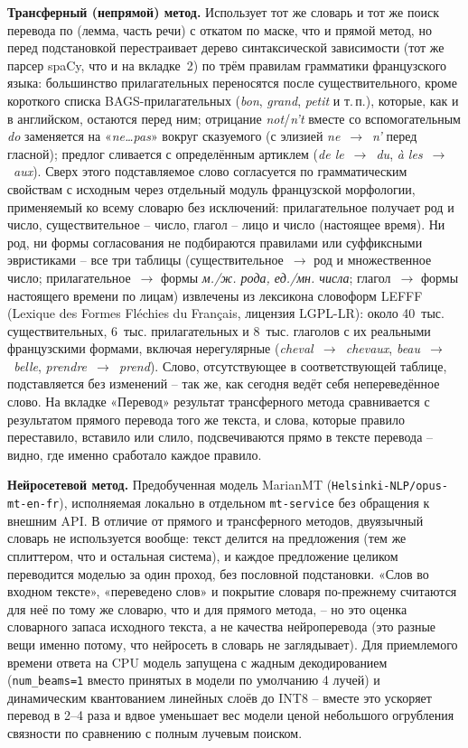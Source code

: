 \textbf{Трансферный (непрямой) метод.} Использует тот же словарь и тот
же поиск перевода по (лемма, часть речи) с откатом по маске, что и
прямой метод, но перед подстановкой перестраивает дерево синтаксической
зависимости (тот же парсер spaCy, что и на вкладке~2) по трём правилам
грамматики французского языка: большинство прилагательных переносятся
после существительного, кроме короткого списка BAGS-прилагательных
(\emph{bon}, \emph{grand}, \emph{petit} и т.\,п.), которые, как и в
английском, остаются перед ним; отрицание \emph{not}/\emph{n't} вместе
со вспомогательным \emph{do} заменяется на «\emph{ne\ldots pas}» вокруг
сказуемого (с элизией \emph{ne}~$\to$~\emph{n'} перед гласной);
предлог сливается с определённым артиклем (\emph{de le}~$\to$~\emph{du},
\emph{à les}~$\to$~\emph{aux}). Сверх этого подставляемое слово согласуется
по грамматическим свойствам с исходным через отдельный модуль французской
морфологии, применяемый ко всему словарю без исключений: прилагательное
получает род и число, существительное -- число, глагол -- лицо и число
(настоящее время). Ни род, ни формы согласования не подбираются правилами
или суффиксными эвристиками -- все три таблицы (существительное~$\to$
род и множественное число; прилагательное~$\to$ формы \emph{м./ж. рода,
ед./мн. числа}; глагол~$\to$ формы настоящего времени по лицам) извлечены
из лексикона словоформ LEFFF (Lexique des Formes Fléchies du Français,
лицензия LGPL-LR): около 40~тыс. существительных, 6~тыс. прилагательных
и 8~тыс. глаголов с их реальными французскими формами, включая
нерегулярные (\emph{cheval~$\to$~chevaux}, \emph{beau~$\to$~belle},
\emph{prendre~$\to$~prend}). Слово, отсутствующее в соответствующей
таблице, подставляется без изменений -- так же, как сегодня ведёт себя
непереведённое слово. На вкладке «Перевод»
результат трансферного метода сравнивается с результатом прямого
перевода того же текста, и слова, которые правило переставило, вставило
или слило, подсвечиваются прямо в тексте перевода -- видно, где именно
сработало каждое правило.

\textbf{Нейросетевой метод.} Предобученная модель MarianMT
(\texttt{Helsinki-NLP/opus-mt-en-fr}), исполняемая локально в отдельном
\texttt{mt-service} без обращения к внешним API. В отличие от прямого и
трансферного методов, двуязычный словарь не используется вообще: текст
делится на предложения (тем же сплиттером, что и остальная система), и
каждое предложение целиком переводится моделью за один проход, без
пословной подстановки. «Слов во входном тексте», «переведено слов» и
покрытие словаря по-прежнему считаются для неё по тому же словарю, что
и для прямого метода, -- но это оценка словарного запаса исходного
текста, а не качества нейроперевода (это разные вещи именно потому, что
нейросеть в словарь не заглядывает). Для приемлемого времени ответа на
CPU модель запущена с жадным декодированием (\texttt{num\_beams=1}
вместо принятых в модели по умолчанию 4 лучей) и динамическим
квантованием линейных слоёв до INT8 -- вместе это ускоряет перевод в
2--4 раза и вдвое уменьшает вес модели ценой небольшого огрубления
связности по сравнению с полным лучевым поиском.

